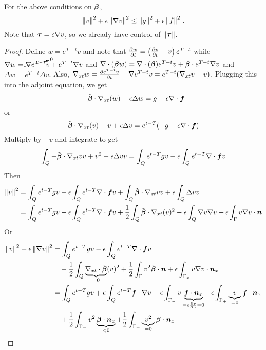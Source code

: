 \documentclass{article}
\begin{document}
\begin{lemma}
For the above conditions on $\boldsymbol\beta$,
\[
\left\| v \right\|^2+\epsilon\left\| \nabla v \right\|^2\leq\left\| g \right\|^2+\epsilon\left\| f \right\|^2\,.
\]
Note that $\boldsymbol\tau=\epsilon\nabla v$, so we already have control of $\left\| \boldsymbol\tau \right\|$.
\end{lemma}
\begin{proof}
Define $w=e^{T-t}v$ and note that $\frac{\partial w}{\partial t}=\left( \frac{\partial v}{\partial t}-v \right)e^{T-t}$ while $\nabla w=\cancelto{0}{\nabla e^{T-t}} v+e^{T-t}\nabla v$ and
$\nabla\cdot(\boldsymbol\beta w)=\nabla\cdot(\boldsymbol\beta)e^{T-t} v+\boldsymbol\beta\cdot e^{T-t}\nabla v$ and $\Delta w=e^{T-t}\Delta v$. 
Also, $\nabla_{xt} w=\frac{\partial e^{T-t} v}{\partial t}+\nabla{e^{T-t} v}=e^{T-t}(\nabla_{xt} v-v)$.
Plugging this into the adjoint equation, we get
\begin{equation*}
-\tilde{\boldsymbol\beta}\cdot\nabla_{xt}(w)-\epsilon\Delta w=g-\epsilon\nabla\cdot\boldsymbol f
\end{equation*}
or 
\begin{equation*}
\tilde{\boldsymbol\beta}\cdot\nabla_{xt}(v)-v+\epsilon\Delta v=e^{t-T}(-g+\epsilon\nabla\cdot\boldsymbol f)
\end{equation*}
Multiply by $-v$ and integrate to get
\begin{align*}
\int_Q-\tilde{\boldsymbol\beta}\cdot\nabla_{xt} vv+v^2-\epsilon\Delta vv=\int_Qe^{t-T}gv-\epsilon\int_Qe^{t-T}\nabla\cdot\boldsymbol f v
\end{align*}
Then
\begin{align*}
\norm{v}^2&=\int_Qe^{t-T}gv
-\epsilon\int_Qe^{t-T}\Div\bff v
+\int_Q\tilde\bfbeta\cdot\Gradxt vv
+\epsilon\int_Q\Delta vv\\
%
&=\int_Qe^{t-T}gv
-\epsilon\int_Qe^{t-T}\Div\bff v
+\frac{1}{2}\int_Q\tilde\bfbeta\cdot\Gradxt(v)^2
-\epsilon\int_Q\Grad v\Grad v
+\epsilon\int_\Gamma v\Grad v\cdot\bfn
\\
\end{align*}
Or
\begin{align*}
\norm{v}^2+\epsilon\norm{\Grad v}^2&=\int_Qe^{t-T}gv
-\epsilon\int_Qe^{t-T}\Div\bff v\\
&\quad-\frac{1}{2}\int_Q\underbrace{\Divxt\tilde\bfbeta}_{=0}(v)^2
+\frac{1}{2}\int_\Gamma v^2\tilde\bfbeta\cdot\bfn
+\epsilon\int_{\Gamma_x} v\Grad v\cdot\bfn_x
\\
&=\int_Qe^{t-T}gv
+\epsilon\int_Qe^{t-T}\bff\cdot\Grad v
-\epsilon\int_{\Gamma_-}v\underbrace{\bff\cdot\bfn_x}_{=\epsilon\pd{v}{n}=0}
-\epsilon\int_{\Gamma_+}\underbrace{v}_{=0}\bff\cdot\bfn_x\\
&\quad+\frac{1}{2}\int_{\Gamma_-} v^2\underbrace{\bfbeta\cdot\bfn_x}_{<0}
+\frac{1}{2}\int_{\Gamma_+} \underbrace{v^2}_{=0}\bfbeta\cdot\bfn_x\\

\end{align*}
\end{proof}
\end{document}
